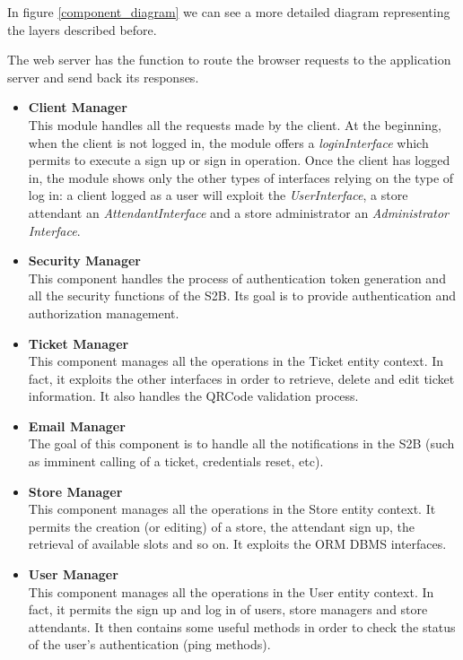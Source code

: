 \documentclass[table, 12pt]{article}
\begin{document}
In figure \ref{component_diagram} we can see a more detailed diagram representing the layers described before.

The web server has the function to route the browser requests to the application server and send back its responses.

\begin{itemize}
    \item \textbf{Client Manager}\\This module handles all the requests made by the client. At the beginning, when the client is not logged in, the module offers a \textit{loginInterface} which permits to execute a sign up or sign in operation. Once the client has logged in, the module shows only the other types of interfaces relying on the type of log in: a client logged as a user will exploit the \textit{UserInterface}, a store attendant an \textit{AttendantInterface} and a store administrator an \textit{Administrator Interface}.
    \item \textbf{Security Manager}\\This component handles the process of authentication token generation and all the security functions of the S2B. Its goal is to provide authentication and authorization management.
    \item \textbf{Ticket Manager}\\This component manages all the operations in the Ticket entity context. In fact, it exploits the other interfaces in order to retrieve, delete and edit ticket information. It also handles the QRCode validation process.
    \item \textbf{Email Manager}\\The goal of this component is to handle all the notifications in the S2B (such as imminent calling of a ticket, credentials reset, etc).
    \item \textbf{Store Manager}\\This component manages all the operations in the Store entity context. It permits the creation (or editing) of a store, the attendant sign up, the retrieval of available slots and so on. It exploits the ORM DBMS interfaces.
    \item \textbf{User Manager}\\This component manages all the operations in the User entity context. In fact, it permits the sign up and log in of users, store managers and store attendants. It then contains some useful methods in order to check the status of the user's authentication (ping methods).
\end{itemize}
\end{document}
